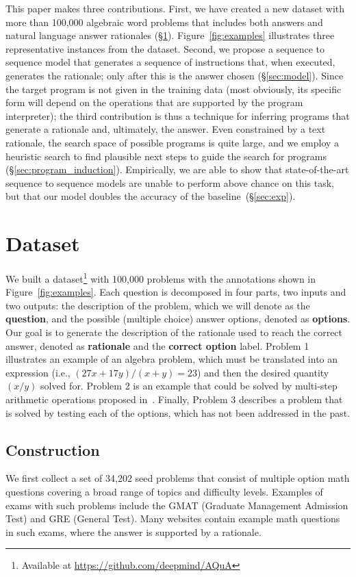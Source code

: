 This paper makes three contributions. First, we have created a new dataset with more than 100,000 algebraic word problems that includes both answers and natural language answer rationales (\S\ref{sec:dataset}). Figure~\ref{fig:examples} illustrates three representative instances from the dataset. Second, we propose a sequence to sequence model that generates a sequence of instructions that, when executed, generates the rationale; only after this is the answer chosen (\S\ref{sec:model}). Since the target program is not given in the training data (most obviously, its specific form will depend on the operations that are supported by the program interpreter); the third contribution is thus a technique for inferring programs that generate a rationale and, ultimately, the answer. Even constrained by a text rationale, the search space of possible programs is quite large, and we employ a heuristic search to find plausible next steps to guide the search for programs (\S\ref{sec:program_induction}). Empirically, we are able to show that state-of-the-art sequence to sequence models are unable to perform above chance on this task, but that our model doubles the accuracy of the baseline~(\S\ref{sec:exp}).

\section{Dataset}
\label{sec:dataset}
We built a dataset\footnote{Available at \url{https://github.com/deepmind/AQuA}} with 100,000 problems with the annotations shown in Figure~\ref{fig:examples}. 
Each question is decomposed in four parts, two inputs and two outputs: the description of the problem, which we will denote as the \textbf{question}, and the possible (multiple choice) answer options, denoted as \textbf{options}. Our goal is to generate the description of the rationale used to reach the correct answer, denoted as \textbf{rationale} and the \textbf{correct option} label. Problem 1 illustrates an example of an algebra problem, which must be translated into an expression (i.e., $(27x + 17y) / (x + y) = 23$) and then the desired quantity $(x/y)$ solved for. Problem 2 is an example that could be solved by multi-step arithmetic operations proposed in~\cite{Roy2015SolvingGA}. Finally, Problem 3 describes a problem that is solved by testing each of the options, which has not been addressed in the past. 

\subsection{Construction}
We first collect a set of 34,202 seed problems that consist of multiple option math questions covering a broad range of topics and difficulty levels. Examples of exams with such problems include the GMAT (Graduate Management Admission Test) and GRE (General Test). Many websites contain example math questions in such exams, where the answer is supported by a rationale.

